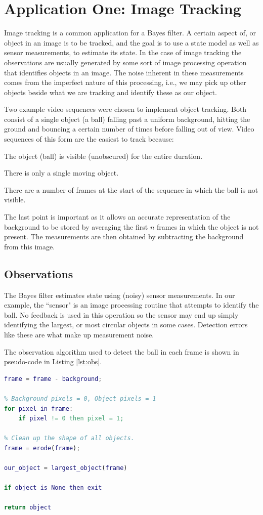 \section{Application One: Image Tracking}
Image tracking is a common application for a Bayes filter. A certain aspect of, or
object in an image is to be tracked, and the goal is to use a state
model as well as sensor measurements, to estimate its state. In the case of image
tracking the observations are usually generated by some sort of image processing
operation that identifies objects in an image. The noise inherent in these measurements
comes from the imperfect nature of this processing, i.e., we may pick up other
objects beside what we are tracking and identify these as our object.

Two example video sequences were chosen to implement object tracking. Both consist
of a single object (a ball) falling past a uniform background, hitting the ground
and bouncing a certain number of times before falling out of view.
Video sequences of this form are the easiest to track because:
\begin{compactitem}
\item The object (ball) is visible (unobscured) for the entire duration.
\item There is only a single moving object.
\item There are a number of frames at the start of the sequence in which the
ball is not visible.
\end{compactitem}
The last point is important as it allows an accurate representation of the background
to be stored by averaging the first $n$ frames in which the object is not present.
The measurements are then obtained by subtracting the background from this image.

\subsection{Observations}
The Bayes filter estimates state using (noisy) sensor measurements. In our example,
the ``sensor" is an image processing routine that attempts to identify the ball.
No feedback is used in this operation so the sensor may end up simply identifying
the largest, or most circular objects in some cases. Detection errors like these
are what make up measurement noise.

The observation algorithm used to detect the ball in each frame is shown in
pseudo-code in Listing \ref{lst:obs}.

\begin{lstlisting}[language=Matlab, label=lst:obs,
caption=Implementation of observation routine.]
% Subtract background from frame
frame = frame - background;

% Background pixels = 0, Object pixels = 1
for pixel in frame:
    if pixel != 0 then pixel = 1;

% Clean up the shape of all objects.
frame = erode(frame);

our_object = largest_object(frame)

if object is None then exit

return object
\end{lstlisting}

